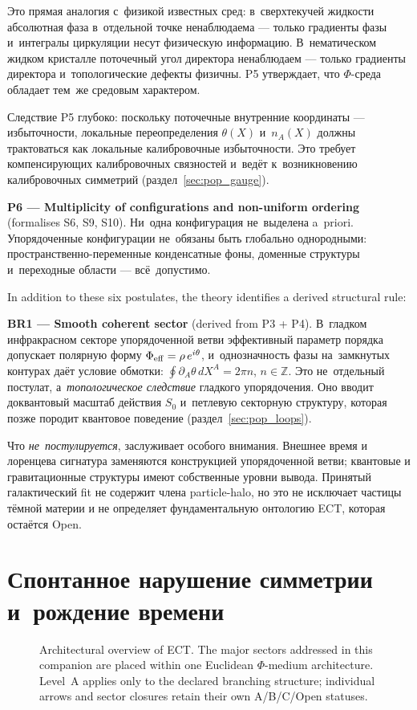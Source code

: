 \documentclass[11pt,a4paper]{article}
\begin{document}
Это прямая аналогия с~физикой известных сред: в~сверхтекучей жидкости абсолютная фаза в~отдельной точке ненаблюдаема --- только градиенты фазы и~интегралы циркуляции несут физическую информацию. В~нематическом жидком кристалле поточечный угол директора ненаблюдаем --- только градиенты директора и~топологические дефекты физичны. P5 утверждает, что $\Phi$-среда обладает тем~же средовым характером.

Следствие P5 глубоко: поскольку поточечные внутренние координаты --- избыточности, локальные переопределения $\theta(X)$ и~$n_A(X)$ должны трактоваться как локальные калибровочные избыточности. Это требует компенсирующих калибровочных связностей и~ведёт к~возникновению калибровочных симметрий (раздел~\ref{sec:pop_gauge}).

\textbf{P6 --- Multiplicity of configurations and non-uniform ordering} (formalises S6, S9, S10).
Ни~одна конфигурация не~выделена a~priori. Упорядоченные конфигурации не~обязаны быть глобально однородными: пространственно-переменные конденсатные фоны, доменные структуры и~переходные области --- всё~допустимо.

In addition to these six postulates, the theory identifies a derived structural rule:

\textbf{BR1 --- Smooth coherent sector} (derived from P3 + P4).
В~гладком инфракрасном секторе упорядоченной ветви эффективный параметр порядка допускает полярную форму $\Phi_{\rm eff} = \rho\,e^{i\theta}$, и~однозначность фазы на~замкнутых контурах даёт условие обмотки: $\oint \partial_A\theta\,dX^A = 2\pi n$, $n \in \mathbb{Z}$. Это не~отдельный постулат, а~\emph{топологическое следствие} гладкого упорядочения. Оно вводит доквантовый масштаб действия $S_0$ и~петлевую секторную структуру, которая позже породит квантовое поведение (раздел~\ref{sec:pop_loops}).

Что \emph{не~постулируется}, заслуживает особого внимания. Внешнее время и лоренцева сигнатура заменяются конструкцией упорядоченной ветви; квантовые и гравитационные структуры имеют собственные уровни вывода. Принятый галактический fit не содержит члена particle-halo, но это не исключает частицы тёмной материи и не определяет фундаментальную онтологию ECT, которая остаётся Open.


\section{Спонтанное нарушение симметрии и~рождение времени}
\label{sec:pop_ssb}

\begin{figure}[H]
\centering
{}
\caption{Architectural overview of ECT.  The major sectors addressed in this companion are placed within one Euclidean $\Phi$-medium architecture. Level~A applies only to the declared branching structure; individual arrows and sector closures retain their own A/B/C/Open statuses.}
\label{fig:pop_architecture}
\end{figure}
\end{document}
